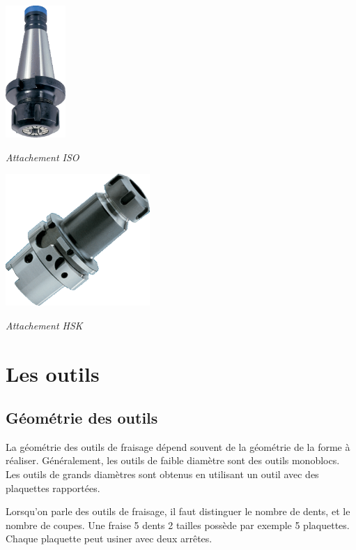 \documentclass[11pt,oneside]{article}
\begin{document}
\begin{minipage}[c]{.45\linewidth}
\begin{center}
\includegraphics[height=5cm]{png/attachement_cone}

\textit{Attachement ISO}
\end{center}
\end{minipage}\hfill
\begin{minipage}[c]{.45\linewidth}
\begin{center}
\includegraphics[height=5cm]{png/attachement_hsk}

\textit{Attachement HSK}
\end{center}
\end{minipage}

\section{Les outils}
\subsection{Géométrie des outils}

La géométrie des outils de fraisage dépend souvent de la géométrie de la forme à réaliser. Généralement, les outils de faible diamètre sont des outils monoblocs. Les outils de grands diamètres sont obtenus en utilisant un outil avec des plaquettes rapportées. 

Lorsqu'on parle des outils de fraisage, il faut distinguer le nombre de dents, et le nombre de coupes. Une fraise 5 dents 2 tailles possède par exemple 5 plaquettes. Chaque plaquette peut usiner avec deux arrêtes. 
\end{document}
